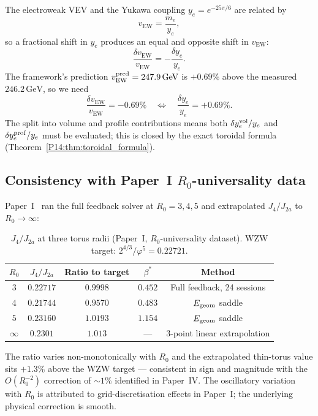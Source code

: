 \documentclass[11pt,a4paper]{article}
\theoremstyle{definition}
\theoremstyle{remark}
\newcommand{\vp}{\varphi}
\newcommand{\bst}{\beta^{*}}
\newcommand{\vEW}{v_{\mathrm{EW}}}
\newcommand{\Jfour}{J_4}
\newcommand{\Ja}{J_{2a}}
\newcommand{\Rzero}{R_0}
\begin{document}
The electroweak VEV and the Yukawa coupling $y_e = e^{-25\pi/6}$ are related by
\begin{equation}
  \vEW = \frac{m_e}{y_e},
  \label{P14:eq:vew_ye}
\end{equation}
so a fractional shift in $y_e$ produces an equal and opposite shift in $\vEW$:
\begin{equation}
  \frac{\delta\vEW}{\vEW} = -\frac{\delta y_e}{y_e}.
  \label{P14:eq:vew_ye_shift}
\end{equation}
The framework's prediction $\vEW^{\rm pred}=247.9\,\mathrm{GeV}$ is $+0.69\%$
above the measured $246.2\,\mathrm{GeV}$, so we need
\begin{equation}
  \frac{\delta\vEW}{\vEW} = -0.69\%
  \quad\Longleftrightarrow\quad
  \frac{\delta y_e}{y_e} = +0.69\%.
  \label{P14:eq:target}
\end{equation}
The split into volume and profile contributions
means both $\delta y_e^{\rm vol}/y_e$ and $\delta y_e^{\rm prof}/y_e$
must be evaluated; this is closed by the exact toroidal
formula (Theorem~\ref{P14:thm:toroidal_formula}).

\subsection{Consistency with Paper~I $R_0$-universality data}

Paper~I~\cite{Paper1} ran the full feedback solver at $\Rzero=3,4,5$
and extrapolated $\Jfour/\Ja$ to $\Rzero\to\infty$:

\begin{table}[h!]
\centering
\caption{$J_4/J_{2a}$ at three torus radii (Paper~I, $R_0$-universality dataset).
WZW target: $2^{4/3}/\vp^5 = 0.22721$.}
\label{P14:tab:paper1_data}
\begin{tabular}{ccccc}
\toprule
$R_0$ & $J_4/J_{2a}$ & Ratio to target & $\bst$ & Method \\
\midrule
$3$ & $0.22717$ & $0.9998$ & $0.452$ & Full feedback, 24 sessions \\
$4$ & $0.21744$ & $0.9570$ & $0.483$ & $E_{\rm geom}$ saddle \\
$5$ & $0.23160$ & $1.0193$ & $1.154$ & $E_{\rm geom}$ saddle \\
$\infty$ & $0.2301$ & $1.013$ & --- & 3-point linear extrapolation \\
\bottomrule
\end{tabular}
\end{table}

The ratio varies non-monotonically with $\Rzero$ and the extrapolated
thin-torus value sits $+1.3\%$ above the WZW target --- consistent in
sign and magnitude with the $O(\Rzero^{-2})$ correction of $\sim1\%$
identified in Paper~IV.
The oscillatory variation with $\Rzero$ is attributed to grid-discretisation
effects in Paper~I; the underlying physical correction is smooth.
\end{document}
